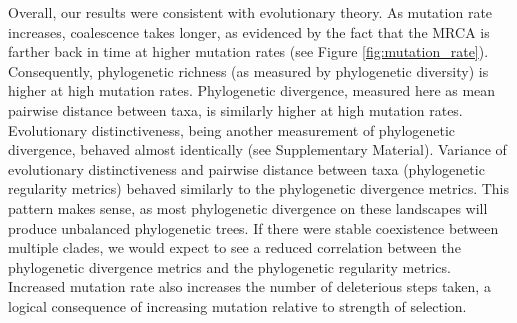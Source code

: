 \documentclass[letterpaper]{article}
\begin{document}
Overall, our results were consistent with %
evolutionary theory. %
As mutation rate increases, coalescence takes longer, as evidenced by the fact that the MRCA is farther back in time at higher mutation rates (see Figure \ref{fig:mutation_rate}). Consequently, phylogenetic richness (as measured by phylogenetic diversity) is higher at high mutation rates. Phylogenetic divergence, measured here as mean pairwise distance between taxa, is similarly higher at high mutation rates. Evolutionary distinctiveness, being another measurement of phylogenetic divergence, behaved almost identically (see Supplementary Material). Variance of evolutionary distinctiveness and pairwise distance between taxa (phylogenetic regularity metrics) behaved similarly to the phylogenetic divergence metrics. This pattern makes sense, as most phylogenetic divergence on these landscapes will produce unbalanced phylogenetic trees. If there were stable coexistence between multiple clades, we would expect to see a reduced correlation between the phylogenetic divergence metrics and the phylogenetic regularity metrics. Increased mutation rate also increases the number of deleterious steps taken, a logical consequence of increasing mutation relative to strength of selection.
\end{document}

